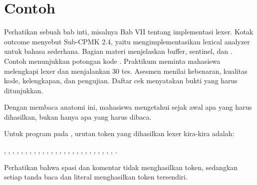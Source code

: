 \section*{Contoh}

\begin{contoh}
Perhatikan sebuah bab inti, misalnya Bab VII tentang implementasi
lexer. Kotak outcome menyebut Sub-CPMK 2.4, yaitu mengimplementasikan
lexical analyzer untuk bahasa sederhana. Bagian materi menjelaskan
buffer, sentinel, dan . Contoh menunjukkan potongan
kode . Praktikum meminta mahasiswa melengkapi lexer
dan menjalankan 30 tes. Asesmen menilai kebenaran, kualitas kode,
kelengkapan, dan pengujian. Daftar cek menyatakan bukti yang harus
ditunjukkan.

Dengan membaca anatomi ini, mahasiswa mengetahui sejak awal apa yang
harus dihasilkan, bukan hanya apa yang harus dibaca.
\end{contoh}

\begin{contoh}
Untuk program pada , urutan token yang dihasilkan
lexer kira-kira adalah:
\begin{center}
, , \code{(}, \code{)}, \code{\{}, ,
, \code{=}, , \code{;}, , ,
\code{=}, , \code{;}, , \code{(}, ,
\code{+}, , \code{)}, \code{;}, , ,
\code{;}, \code{\}}, .
\end{center}
Perhatikan bahwa spasi dan komentar tidak menghasilkan token, sedangkan
setiap tanda baca dan literal menghasilkan token tersendiri.
\end{contoh}
